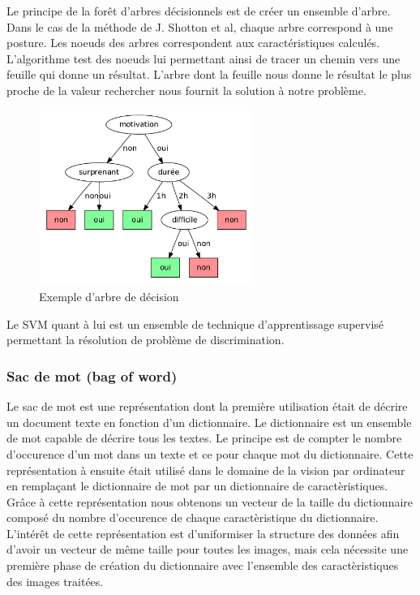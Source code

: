 Le principe de la forêt d'arbres décisionnels\cite{randomDecisionForest} est de créer un ensemble d'arbre.
Dans le cas de la méthode de J. Shotton et al\cite{kinectSegmentation}, chaque arbre correspond à une posture.
Les noeuds des arbres correspondent aux caractéristiques calculés. L'algorithme test des noeuds lui permettant ainsi de tracer un
chemin vers une feuille qui donne un résultat. L'arbre dont la feuille nous donne le résultat le plus proche 
de la valeur rechercher nous fournit la solution à notre problème.\\

\begin{figure}[!h]
  \begin{center}
    \includegraphics[width=7cm]{image/randomForest.png}
    \caption{Exemple d'arbre de décision}
  \end{center}
\end{figure}

Le SVM\cite{SVM} quant à lui est un ensemble de technique d'apprentissage supervisé permettant la résolution de 
problème de discrimination.

\subsubsection{Sac de mot (bag of word)}
Le sac de mot est une représentation dont la première utilisation était de décrire un document texte en fonction d'un dictionnaire.
Le dictionnaire est un ensemble de mot capable de décrire tous les textes.
Le principe est de compter le nombre d'occurence d'un mot dans un texte et ce pour chaque mot du dictionnaire. Cette représentation
à ensuite était utilisé dans le domaine de la vision par ordinateur\cite{BagOfWord} en remplaçant le dictionnaire de mot par un dictionnaire
de caractèristiques. Grâce à cette représentation nous obtenons un vecteur de la taille du dictionnaire composé du nombre 
d'occurence de chaque caractèristique du dictionnaire. L'intérêt de cette représentation est d'uniformiser la structure des données
afin d'avoir un vecteur de même taille pour toutes les images, mais cela nécessite une première phase de création du dictionnaire
avec l'ensemble des caractèristiques des images traitées.

